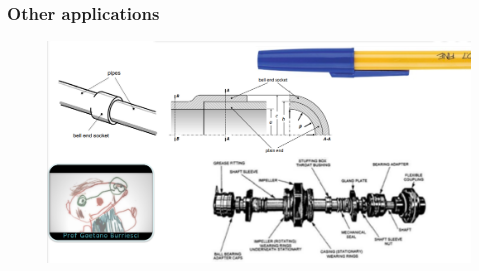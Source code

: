 \documentclass[class=report, crop=false, 12pt,a4paper]{standalone}
\begin{document}
\subsubsection{Other applications}
\begin{figure}[H]
    \centering
    \includegraphics[width = \textwidth]{../img/diagram122.png}
    \caption{}
\end{figure}
\end{document}
